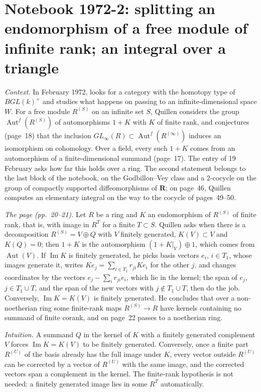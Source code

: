 \section[Notebook 1972-2: splitting finite-rank endomorphisms; an integral over a triangle]{Notebook 1972-2: splitting an endomorphism of a free module of infinite rank; an integral over a triangle\protect{}}\label{sec:quillen-1972-2}

\emph{Context.} In February 1972,  looks for a category with the homotopy type of $BGL(k)^+$ and studies what happens on passing to an infinite-dimensional space $W$. For a free module $R^{(S)}$ on an infinite set $S$, Quillen considers the group $\operatorname{Aut}^f(R^{(S)})$ of automorphisms $1 + K$ with $K$ of finite rank, and conjectures (page~18) that the inclusion $GL_\infty(R) \subset \operatorname{Aut}^f(R^{(\infty)})$ induces an isomorphism on cohomology. Over a field, every such $1 + K$ comes from an automorphism of a finite-dimensional summand (page~17). The entry of 19 February asks how far this holds over a ring. The second statement belongs to the last block of the notebook, on the Godbillon--Vey class and a $2$-cocycle on the group of compactly supported diffeomorphisms of $\mathbf R$; on page~46, Quillen computes an elementary integral on the way to the cocycle of pages~49--50.

\emph{The page (pp.~20--21).} Let $R$ be a ring and $K$ an endomorphism of $R^{(S)}$ of finite rank, that is, with image in $R^T$ for a finite $T \subset S$. Quillen asks when there is a decomposition $R^{(S)} = V \oplus Q$ with $V$ finitely generated, $K(V) \subset V$ and $K(Q) = 0$; then $1 + K$ is the automorphism $(1 + K|_V) \oplus 1$, which comes from $\operatorname{Aut}(V)$. If $\operatorname{Im} K$ is finitely generated, he picks basis vectors $e_i$, $i \in T_1$, whose images generate it, writes $K e_j = \sum_{i \in T_1} r_{ji} K e_i$ for the other $j$, and changes coordinates by the vectors $e_j - \sum_i r_{ji} e_i$, which lie in the kernel; the span of $e_j$, $j \in T_1 \cup T$, and the span of the new vectors with $j \notin T_1 \cup T$, then do the job. Conversely, $\operatorname{Im} K = K(V)$ is finitely generated. He concludes that over a non-noetherian ring some finite-rank maps $R^{(S)} \to R$ have kernels containing no summand of finite corank, and on page~22 passes to a noetherian ring.

\emph{Intuition.} A summand $Q$ in the kernel of $K$ with a finitely generated complement $V$ forces $\operatorname{Im} K = K(V)$ to be finitely generated. Conversely, once a finite part $R^{(U)}$ of the basis already has the full image under $K$, every vector outside $R^{(U)}$ can be corrected by a vector of $R^{(U)}$ with the same image, and the corrected vectors span a complement in the kernel. The finite-rank hypothesis is not needed: a finitely generated image lies in some $R^T$ automatically.

